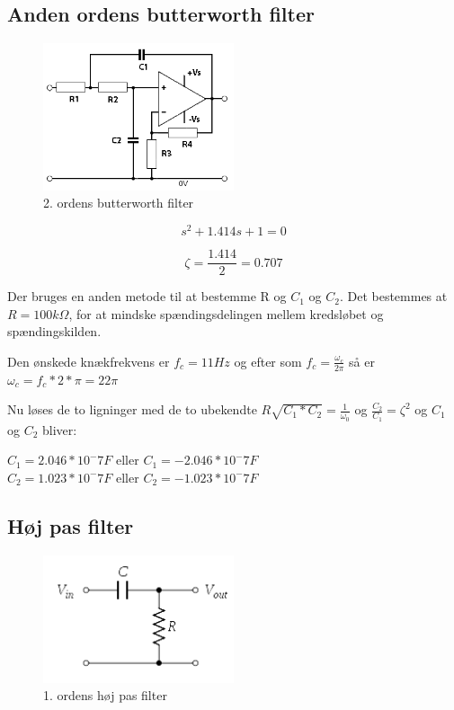 \subsection{Anden ordens butterworth filter}
\begin{figure}[H]
	\centering
	\includegraphics[width = 0.5\textwidth]{billeder/2ordensButterworth.png}
	\caption{2. ordens butterworth filter}\label{fig:butterworth}
\end{figure}

\begin{equation}
	s^2 + 1.414s +1 = 0 
\end{equation}

\begin{equation}
	\zeta = \frac{1.414}{2} = 0.707
\end{equation}

Der bruges en anden metode til at bestemme R og $C_1$ og $C_2$. Det bestemmes at $R = 100k \Omega $, for at mindske spændingsdelingen mellem kredsløbet og spændingskilden.

Den ønskede knækfrekvens er $f_c = 11Hz$ og efter som $f_c = \frac{\omega_c}{2 \pi} $ så er $\omega_c = f_c * 2 * \pi = 22 \pi $

Nu løses de to ligninger med de to ubekendte $R \sqrt{C_1 * C_2} = \frac{1}{\omega_0}$ og $ \frac{C_2}{C_1} = \zeta^2$ og $C_1$ og $C_2$ bliver:

$C_1 = 2.046*10^-7F$ eller $ C_1 = -2.046*10^-7F$ \\
$C_2 = 1.023*10^-7F$ eller $ C_2 = -1.023*10^-7F$ \\

\subsection{Høj pas filter}
\begin{figure}[H]
	\centering
	\includegraphics[width = 0.5\textwidth]{billeder/HighPass.png}
	\caption{1. ordens høj pas filter}\label{fig:highpass}
\end{figure}

